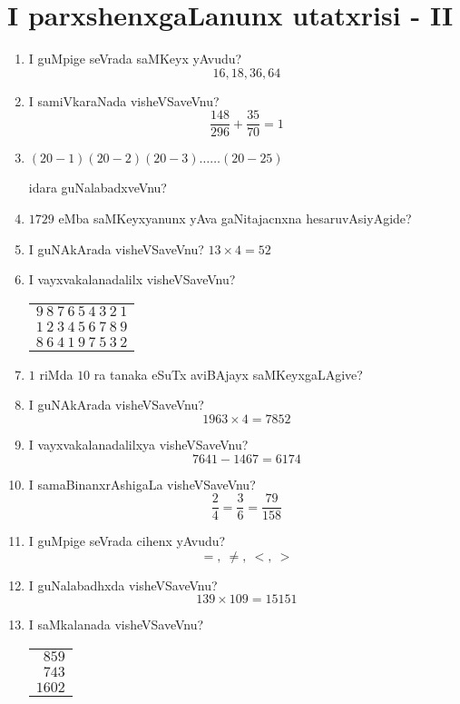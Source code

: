 \chapter{I parxshenxgaLanunx utatxrisi - {\rm II}}

\begin{enumerate}
  \renewcommand{\labelenumi}{(\rm\theenumi)}
  \itemsep=1pt
\item I guMpige seVrada saMKeyx yAvudu?
$$
16,18,36,64
$$

\item I samiVkaraNada visheVSaveVnu?
$$
\dfrac{148}{296}+\dfrac{35}{70}=1
$$

\item $(20-1)(20-2)(20-3)\ldots\ldots(20-25)$

idara guNalabadxveVnu?

\item $1729$ eMba saMKeyxyanunx yAva gaNitajacnxna hesaruvAsiyAgide?

\item I guNAkArada visheVSaveVnu? $13\times 4=52$

\item I vayxvakalanadalilx visheVSaveVnu?
\begin{center}
\begin{tabular}{l}
$9~8~7~6~5~4~3~2~1$\\
$1~2~3~4~5~6~7~8~9$\\
\hline
$8~6~4~1~9~7~5~3~2$
\end{tabular}
\end{center}

\item $1$ riMda $10$ ra tanaka eSuTx aviBAjayx saMKeyxgaLAgive?

\item I guNAkArada visheVSaveVnu?
$$
1963\times 4=7852
$$

\item I vayxvakalanadalilxya visheVSaveVnu?
$$
7641-1467=6174
$$

\item I samaBinanxrAshigaLa visheVSaveVnu?
$$
\dfrac{2}{4}=\dfrac{3}{6}=\dfrac{79}{158}
$$

\item I guMpige seVrada cihenx yAvudu?
$$
=, ~ \neq, ~ <, ~ >
$$

\item I guNalabadhxda visheVSaveVnu?
$$
139\times 109=15151
$$

\item I saMkalanada visheVSaveVnu?
\begin{center}
\begin{tabular}{r}
$859$\\
$743$\\
\hline
$1602$
\end{tabular}
\end{center}


\end{enumerate}
